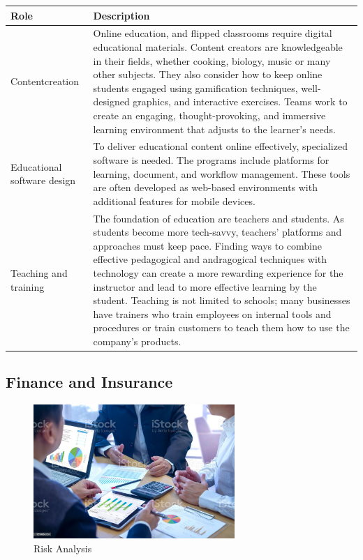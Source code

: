 \begin{table}[H]
	\begin{center}
		\begin{tabular}{p{1in}|p{3.4in}} 
			\textbf{Role} & \textbf{Description}\\
			\hline
			Content\linebreak creation & Online education, and flipped classrooms require digital educational materials. Content creators are knowledgeable in their fields, whether cooking, biology, music or many other subjects. They also consider how to keep online students engaged using gamification techniques, well-designed graphics, and interactive exercises. Teams work to create an engaging, thought-provoking, and immersive learning environment that adjusts to the learner's needs.\\
			\hline
			Educational software design & To deliver educational content online effectively, specialized software is needed. The programs include platforms for learning, document, and workflow management. These tools are often developed as web-based environments with additional features for mobile devices.\\
			\hline
			Teaching and training & The foundation of education are teachers and students. As students become more tech-savvy, teachers' platforms and approaches must keep pace. Finding ways to combine effective pedagogical and andragogical techniques with technology can create a more rewarding experience for the instructor and lead to more effective learning by the student. Teaching is not limited to schools; many businesses have trainers who train employees on internal tools and procedures or train customers to teach them how to use the company's products.\\
			\hline
		\end{tabular}
	\end{center}
\end{table}

\subsection{Finance and Insurance}

\begin{figure}[H]
	\begin{center}
		\caption{Risk Analysis}
		\vskip 4pt
		\includegraphics[height=2in]{images/careers/istockphoto-1210565724-1024x1024.jpg}
	\end{center}
\end{figure}

